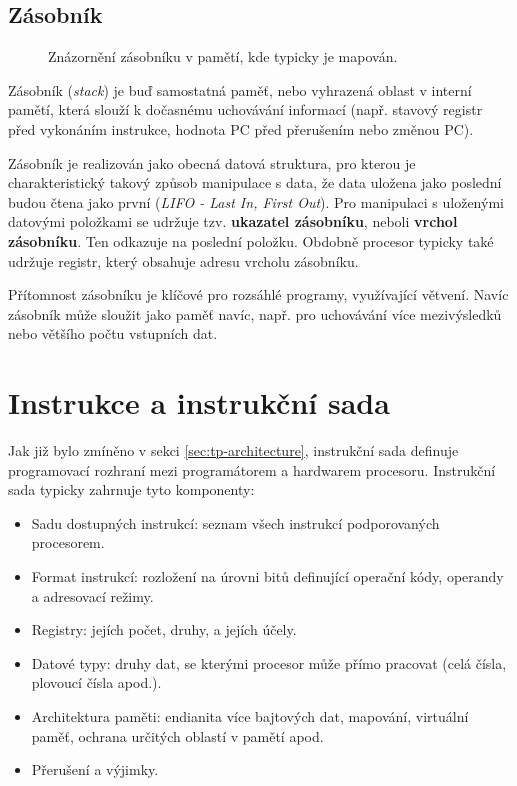 \label{sec:tp-stack}
\subsection{Zásobník}

\begin{figure}[htbp]
    \centering
    
    \caption{Znázornění zásobníku v pamětí, kde typicky je mapován.}
    \label{fig:stack}
\end{figure}

Zásobník (\textit{stack}) je buď samostatná paměť, nebo vyhrazená oblast v interní pamětí,
která slouží k dočasnému uchovávání informací (např. stavový registr před vykonáním instrukce,
hodnota PC před přerušením nebo změnou PC).

Zásobník je realizován jako obecná datová struktura, pro kterou je charakteristický takový způsob
manipulace s data, že data uložena jako poslední budou čtena jako první (\textit{LIFO - Last In,
First Out}). Pro manipulaci s uloženými datovými položkami se udržuje tzv. \textbf{ukazatel
zásobníku}, neboli \textbf{vrchol zásobníku}. Ten odkazuje na poslední položku. Obdobně procesor
typicky také udržuje registr, který obsahuje adresu vrcholu zásobníku.

Přítomnost zásobníku je klíčové pro rozsáhlé programy, využívající větvení. Navíc zásobník může
sloužit jako paměť navíc, např. pro uchovávání více mezivýsledků nebo většího počtu vstupních dat.

\section{Instrukce a instrukční sada}

Jak již bylo zmíněno v sekci \ref{sec:tp-architecture}, instrukční sada definuje programovací
rozhraní mezi programátorem a hardwarem procesoru. Instrukční sada typicky zahrnuje tyto komponenty:

\begin{itemize}
    \item Sadu dostupných instrukcí: seznam všech instrukcí podporovaných procesorem.
    \item Format instrukcí: rozložení na úrovni bitů definující operační kódy, operandy a adresovací
        režimy.
    \item Registry: jejích počet, druhy, a jejích účely.
    \item Datové typy: druhy dat, se kterými procesor může přímo pracovat (celá čísla, plovoucí
        čísla apod.).
    \item Architektura paměti: endianita více bajtových dat, mapování, virtuální paměť, ochrana
        určitých oblastí v pamětí apod.
    \item Přerušení a výjimky.
\end{itemize}

